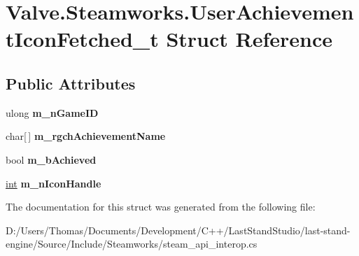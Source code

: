 \hypertarget{structValve_1_1Steamworks_1_1UserAchievementIconFetched__t}{}\section{Valve.\+Steamworks.\+User\+Achievement\+Icon\+Fetched\+\_\+t Struct Reference}
\label{structValve_1_1Steamworks_1_1UserAchievementIconFetched__t}
\subsection*{Public Attributes}
\begin{DoxyCompactItemize}
\item 
\hypertarget{structValve_1_1Steamworks_1_1UserAchievementIconFetched__t_af614b52e4242109390e57b14d8361e07}{}ulong {\bfseries m\+\_\+n\+Game\+I\+D}\label{structValve_1_1Steamworks_1_1UserAchievementIconFetched__t_af614b52e4242109390e57b14d8361e07}

\item 
\hypertarget{structValve_1_1Steamworks_1_1UserAchievementIconFetched__t_ad77892a49d7a37450f074fe6277427ff}{}char\mbox{[}$\,$\mbox{]} {\bfseries m\+\_\+rgch\+Achievement\+Name}\label{structValve_1_1Steamworks_1_1UserAchievementIconFetched__t_ad77892a49d7a37450f074fe6277427ff}

\item 
\hypertarget{structValve_1_1Steamworks_1_1UserAchievementIconFetched__t_a4419836f7bff81125dffa3481157ca4b}{}bool {\bfseries m\+\_\+b\+Achieved}\label{structValve_1_1Steamworks_1_1UserAchievementIconFetched__t_a4419836f7bff81125dffa3481157ca4b}

\item 
\hypertarget{structValve_1_1Steamworks_1_1UserAchievementIconFetched__t_a6b1cc091f32232429cc2a818a1032215}{}\hyperlink{SDL__thread_8h_a6a64f9be4433e4de6e2f2f548cf3c08e}{int} {\bfseries m\+\_\+n\+Icon\+Handle}\label{structValve_1_1Steamworks_1_1UserAchievementIconFetched__t_a6b1cc091f32232429cc2a818a1032215}

\end{DoxyCompactItemize}


The documentation for this struct was generated from the following file\+:\begin{DoxyCompactItemize}
\item 
D\+:/\+Users/\+Thomas/\+Documents/\+Development/\+C++/\+Last\+Stand\+Studio/last-\/stand-\/engine/\+Source/\+Include/\+Steamworks/steam\+\_\+api\+\_\+interop.\+cs\end{DoxyCompactItemize}
